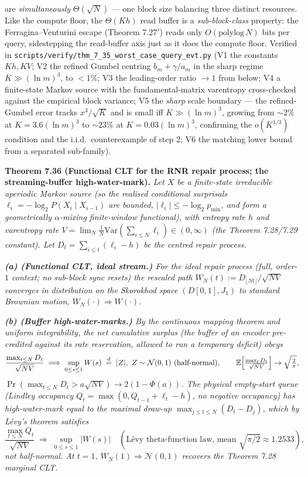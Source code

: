 \documentclass[
]{article}
\begin{document}
are \emph{simultaneously} $\Theta(\sqrt N)$ --- one block size balancing three distinct
resources. Like the compute floor, the $\Theta(Kh)$ read buffer is a \emph{sub-block-class}
property: the Ferragina--Venturini escape (Theorem 7.27$'$) reads only $O(\mathrm{polylog}\,N)$
bits per query, sidestepping the read-buffer axis just as it does the compute floor. Verified in
\texttt{scripts/verify/thm\_7\_35\_worst\_case\_query\_evt.py} (V1 the constants $Kh,KV$;
V2 the refined Gumbel centring $b_m+\gamma/a_m$ in the sharp regime $K\gg(\ln m)^3$, to
$<\!1\%$; V3 the leading-order ratio $\to1$ from below; V4 a finite-state Markov source with
the fundamental-matrix varentropy cross-checked against the empirical block variance; V5 the
\emph{sharp} scale boundary --- the refined-Gumbel error tracks $x^3/\sqrt K$ and is small
iff $K\gg(\ln m)^3$, growing from $\sim\!2\%$ at $K=3.6(\ln m)^3$ to $\sim\!23\%$ at
$K=0.03(\ln m)^3$, confirming the $o(K^{1/3})$ condition and the i.i.d.\ counterexample of
step 2; V6 the matching lower bound from a separated sub-family).

\textbf{Theorem 7.36 (Functional CLT for the RNR repair process; the streaming-buffer
high-water-mark).} \emph{Let $X$ be a finite-state irreducible aperiodic Markov source (so
the realised conditional surprisals $\ell_i=-\log_2 P(X_i\mid X_{i-1})$ are bounded,
$|\ell_i|\le-\log_2 p_{\min}$, and form a geometrically $\alpha$-mixing finite-window
functional), with entropy rate $h$ and varentropy rate
$V=\lim_N\frac1N\mathrm{Var}(\sum_{i\le N}\ell_i)\in(0,\infty)$ (the Theorem 7.28/7.29
constant). Let $D_t=\sum_{i\le t}(\ell_i-h)$ be the centred repair process.}

\emph{\textbf{(a) (Functional CLT, ideal stream.)} For the ideal repair process (full,
order-$1$ context; no sub-block sync resets) the rescaled path
$W_N(t):=D_{\lfloor Nt\rfloor}/\sqrt{NV}$ converges in distribution on the Skorokhod space
$(D[0,1],J_1)$ to standard Brownian motion, $W_N(\cdot)\Rightarrow W(\cdot)$.}

\emph{\textbf{(b) (Buffer high-water-marks.)} By the continuous mapping theorem and uniform
integrability, the \emph{net cumulative surplus} (the buffer of an encoder pre-credited
against its rate reservation, allowed to run a temporary deficit) obeys}
\[
  \frac{\max_{t\le N}D_t}{\sqrt{NV}}\;\Longrightarrow\;\sup_{0\le s\le1}W(s)\;\overset{d}{=}\;|Z|,
  \ Z\sim\mathcal N(0,1)\ (\text{half-normal}),\qquad
  \mathbb E\Bigl[\tfrac{\max_t D_t}{\sqrt{NV}}\Bigr]\to\sqrt{\tfrac2\pi},
\]
\emph{$\Pr(\max_{t\le N}D_t>a\sqrt{NV})\to2(1-\Phi(a))$. The \emph{physical} empty-start
queue (Lindley occupancy $Q_t=\max(0,Q_{t-1}+\ell_t-h)$, no negative occupancy) has
high-water-mark equal to the maximal draw-up $\max_{j\le t\le N}(D_t-D_j)$, which by L\'evy's
theorem satisfies}
\[
  \frac{\max_{t\le N}Q_t}{\sqrt{NV}}\;\Longrightarrow\;\sup_{0\le s\le1}|W(s)|\quad
  (\text{L\'evy theta-function law, mean }\sqrt{\pi/2}\approx1.2533),
\]
\emph{not half-normal. At $t=1$, $W_N(1)\Rightarrow\mathcal N(0,1)$ recovers the Theorem 7.28
marginal CLT.}
\end{document}
